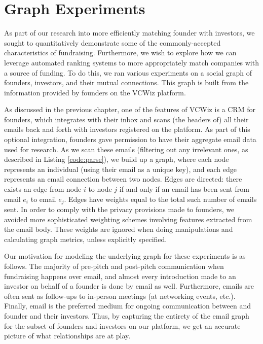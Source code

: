 \chapter{Graph Experiments}
\label{ch:ch5}

As part of our research into more efficiently matching founder with investors, we sought to quantitatively demonstrate some of the commonly-accepted characteristics of fundraising. Furthermore, we wish to explore how we can leverage automated ranking systems to more appropriately match companies with a source of funding. To do this, we ran various experiments on a social graph of founders, investors, and their mutual connections. This graph is built from the information provided by founders on the VCWiz platform.

As discussed in the previous chapter, one of the features of VCWiz is a CRM for founders, which integrates with their inbox and scans (the headers of) all their emails back and forth with investors registered on the platform. As part of this optional integration, founders gave permission to have their aggregate email data used for research. As we scan these emails (filtering out any irrelevant ones, as described in Listing \ref{code:parse}), we build up a graph, where each node represents an individual (using their email as a unique key), and each edge represents an email connection between two nodes. Edges are directed: there exists an edge from node $i$ to node $j$ if and only if an email has been sent from email $e_i$ to email $e_j$. Edges have weights equal to the total such number of emails sent. In order to comply with the privacy provisions made to founders, we avoided more sophisticated weighting schemes involving features extracted from the email body. These weights are ignored when doing manipulations and calculating graph metrics, unless explicitly specified.

Our motivation for modeling the underlying graph for these experiments is as follows. The majority of pre-pitch and post-pitch communication when fundraising happens over email, and almost every introduction made to an investor on behalf of a founder is done by email as well. Furthermore, emails are often sent as follow-ups to in-person meetings (at networking events, etc.). Finally, email is the preferred medium for ongoing communication between and founder and their investors. Thus, by capturing the entirety of the email graph for the subset of founders and investors on our platform, we get an accurate picture of what relationships are at play.

